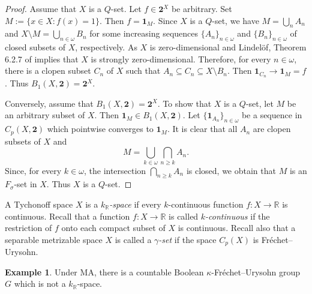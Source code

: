 \documentclass[preprint,11pt]{elsarticle}
\theoremstyle{definition}
\newtheorem{example}[theorem]{Example}
\theoremstyle{remark}
\numberwithin{equation}{section}
\numberwithin{theorem}{section}
\newcommand{\w}{\omega}
\newcommand{\IR}{\mathbb{R}}
\newcommand{\SM}{{\setminus}}
\begin{document}
\begin{proof}
Assume that $X$ is a $Q$-set. Let $f\in \mathbf{2}^X$ be arbitrary. Set  $M:=\{x\in X: f(x)=1\}$. Then $f=\mathbf{1}_M$. Since $X$ is a $Q$-set, we have $M=\bigcup_n A_n$ and $X\SM M=\bigcup_{n\in\w} B_n$ for some increasing sequences $\{A_n\}_{n\in\w}$ and  $\{B_n\}_{n\in\w}$ of closed subsets of $X$, respectively. As $X$ is zero-dimensional and Lindel\"{o}f, Theorem 6.2.7 of \cite{Eng} implies that $X$ is strongly zero-dimensional. Therefore, for every $n\in\w$, there is  a clopen subset $C_n$ of $X$ such that $A_n \subseteq C_n \subseteq X\SM B_n$. Then $\mathbf{1}_{C_n}\to \mathbf{1}_M=f$. Thus  $B_1(X,\mathbf{2})=\mathbf{2}^X$.
\smallskip

Conversely, assume that  $B_1(X,\mathbf{2})=\mathbf{2}^X$. To show that $X$ is a $Q$-set, let $M$ be an arbitrary subset of $X$. Then $\mathbf{1}_M\in B_1(X,\mathbf{2})$. Let $\{ \mathbf{1}_{A_n}\}_{n\in\w}$ be  a sequence in $C_p(X,\mathbf{2})$ which pointwise  converges to $\mathbf{1}_M$. It is clear that all $A_n$ are clopen subsets of $X$ and
\[
M=\bigcup_{k\in\w} \bigcap_{n\geq k} A_n.
\]
Since, for every $k\in\w$, the intersection $ \bigcap_{n\geq k} A_n$ is closed, we obtain that $M$ is an $F_\sigma$-set in $X$. Thus $X$ is a $Q$-set.
\end{proof}


A Tychonoff space $X$ is a {\em $k_\IR$-space} if every $k$-continuous function $f:X\to\IR$ is continuous. Recall that a function $f:X\to\IR$ is called {\em $k$-continuous} if the restriction of $f$ onto each compact subset of $X$ is continuous.
Recall also that a separable metrizable space $X$ is called a {\em $\gamma$-set} if the space $C_p(X)$ is Fr\'{e}chet--Urysohn.


\begin{example} \label{exa:kFU-count-non-kR}
Under $\mathrm{MA}$, there is a countable Boolean  $\kappa$-Fr\'{e}chet--Urysohn group $G$ which is not a $k_\IR$-space.
\end{example}
\end{document}
